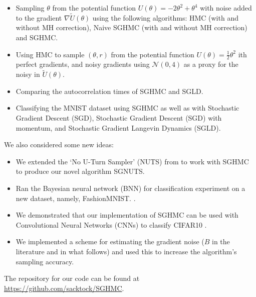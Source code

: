 \begin{itemize}
    \item Sampling $\theta$ from the potential function $U(\theta) = -2\theta^2 + \theta^4$ with noise added to the gradient $\nabla \widetilde U (\theta)$ using the following algorithms: HMC (with and without MH correction), Naive SGHMC (with and without MH correction) and SGHMC.

    \item  Using HMC to sample $(\theta,r)$ from the potential function $U(\theta) = \frac{1}{2}\theta^2$ ith perfect gradients, and noisy gradients using
$\mathcal{N}(0,4)$ as a proxy for the noisy in $\widetilde U (\theta)$.
  \item Comparing the autocorrelation times of SGHMC and SGLD.
    \item Classifying the MNIST dataset \cite{mnist} using SGHMC as well as with Stochastic Gradient Descent (SGD), Stochastic Gradient Descent (SGD) with momentum, and Stochastic Gradient Langevin Dynamics (SGLD).
\end{itemize}

We also considered some new ideas:

\begin{itemize}
    \item We extended the `No U-Turn Sampler' (NUTS) from \cite{nuts} to work with SGHMC to produce our novel algorithm SGNUTS.
    \item Ran the Bayesian neural network (BNN) for classification experiment on a new dataset, namely, FashionMNIST. \cite{fashion-mnist}.
    \item We demonstrated that our implementation of SGHMC can be used with Convolutional Neural Networks (CNNs) to classify CIFAR10 \cite{cifar10}.
    \item We implemented a scheme for estimating the gradient noise ($B$ in the literature and in what follows) and used this to increase the algorithm’s sampling accuracy.
\end{itemize}

The repository for our code can be found at \url{https://github.com/sacktock/SGHMC}.

